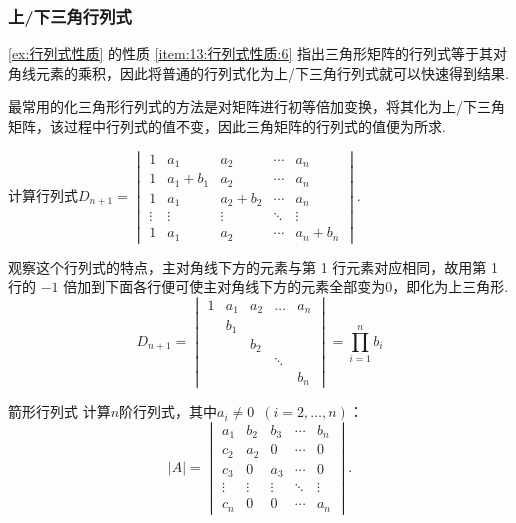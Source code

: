 \subsubsection{上/下三角行列式}

\autoref{ex:行列式性质} 的性质 \ref{item:13:行列式性质:6} 指出三角形矩阵的行列式等于其对角线元素的乘积，因此将普通的行列式化为上/下三角行列式就可以快速得到结果.

最常用的化三角形行列式的方法是对矩阵进行初等倍加变换，将其化为上/下三角矩阵，该过程中行列式的值不变，因此三角矩阵的行列式的值便为所求.

\begin{example}{}{}
    计算行列式$D_{n+1}=\begin{vmatrix}
            1      & a_{1}       & a_{2}       & \cdots & a_n       \\
            1      & a_{1}+b_{1} & a_{2}       & \cdots & a_n       \\
            1      & a_{1}       & a_{2}+b_{2} & \cdots & a_n       \\
            \vdots & \vdots      & \vdots      & \ddots & \vdots    \\
            1      & a_{1}       & a_{2}       & \cdots & a_n+b_{n}
        \end{vmatrix}$.
\end{example}

\begin{solution}
    观察这个行列式的特点，主对角线下方的元素与第 1 行元素对应相同，故用第 1 行的 $-1$ 倍加到下面各行便可使主对角线下方的元素全部变为0，即化为上三角形.
    \[ D_{n+1}=\begin{vmatrix}
            1 & a_{1} & a_{2} & \ldots & a_n   \\
              & b_{1} &       &        &       \\
              &       & b_{2} &        &       \\
              &       &       & \ddots &       \\
              &       &       &        & b_{n}
        \end{vmatrix}=\prod_{i=1}^n b_i \]
\end{solution}

\begin{example}{箭形行列式}{}
    计算$n$阶行列式，其中$a_i\neq 0\enspace(i=2,\ldots,n)$：
    \[|A|=\begin{vmatrix}
            a_1    & b_2    & b_3    & \cdots & b_n    \\
            c_2    & a_2    & 0      & \cdots & 0      \\
            c_3    & 0      & a_3    & \cdots & 0      \\
            \vdots & \vdots & \vdots & \ddots & \vdots \\
            c_n    & 0      & 0      & \cdots & a_n
        \end{vmatrix}.\]
\end{example}

